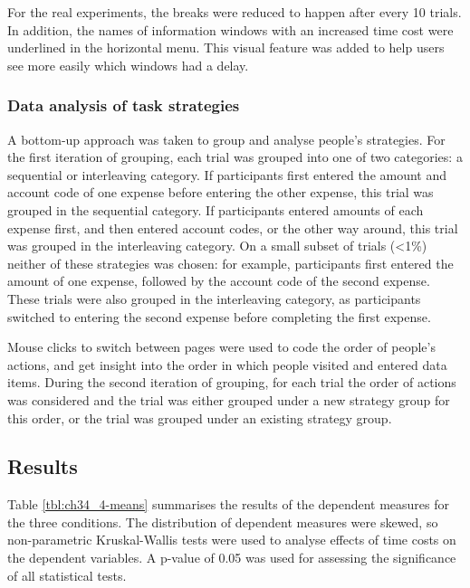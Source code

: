 For the real experiments, the breaks were reduced to happen after every 10 trials. In addition, the names of information windows with an increased time cost were underlined in the horizontal menu. This visual feature was added to help users see more easily which windows had a delay.

\subsubsection{Data analysis of task strategies}
A bottom-up approach was taken to group and analyse people's strategies. For the first iteration of grouping, each trial was grouped into one of two categories: a sequential or interleaving category. If participants first entered the amount and account code of one expense before entering the other expense, this trial was grouped in the sequential category. If participants entered amounts of each expense first, and then entered account codes, or the other way around, this trial was grouped in the interleaving category. On a small subset of trials (<1\%) neither of these strategies was chosen: for example, participants first entered the amount of one expense, followed by the account code of the second expense. These trials were also grouped in the interleaving category, as participants switched to entering the second expense before completing the first expense.

Mouse clicks to switch between pages were used to code the order of people's actions, and get insight into the order in which people visited and entered data items. During the second iteration of grouping, for each trial the order of actions was considered and the trial was either grouped under a new strategy group for this order, or the trial was grouped under an existing strategy group. 

\subsection{Results}
Table \ref{tbl:ch34_4-means} summarises the results of the dependent measures for the three conditions. The distribution of dependent measures were skewed, so non-parametric Kruskal-Wallis tests were used to analyse effects of time costs on the dependent variables. A p-value of 0.05 was used for assessing the significance of all statistical tests. 

